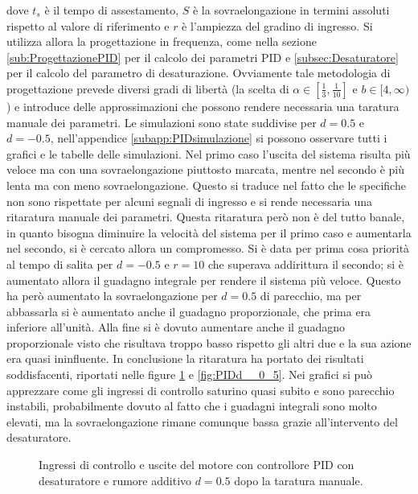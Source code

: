 		\noindent dove $t_s$ è il tempo di assestamento, $S$ è la sovraelongazione in termini assoluti rispetto al valore di
		riferimento e $r$ è l'ampiezza del gradino di ingresso. Si utilizza allora la progettazione in frequenza, come nella sezione \ref{sub:ProgettazionePID} per il calcolo dei parametri PID e \ref{subsec:Desaturatore} per il calcolo del parametro di desaturazione. Ovviamente tale metodologia di progettazione prevede diversi gradi di libertà (la scelta di $\alpha \in [\frac{1}{3},\frac{1}{10}]
		$ e $b \in [4, \infty)$) e introduce delle approssimazioni che possono rendere necessaria una taratura manuale dei parametri. Le simulazioni sono state suddivise per $d=0.5$ e $d=-0.5$, nell'appendice \ref{subapp:PIDsimulazione} si possono osservare tutti i grafici e le tabelle delle simulazioni. Nel primo caso l'uscita del sistema risulta più veloce ma con una sovraelongazione piuttosto marcata, mentre nel secondo è più lenta ma con meno sovraelongazione. Questo si traduce nel fatto che le specifiche non sono rispettate per alcuni segnali di ingresso e si rende necessaria una ritaratura manuale dei parametri. Questa ritaratura però non è del tutto banale, in quanto bisogna diminuire la velocità del sistema per il primo caso e aumentarla nel secondo, si è cercato allora un compromesso. Si è data per prima cosa priorità al tempo di salita per $d=-0.5$ e $r=10$ che superava addirittura il secondo; si è aumentato allora il guadagno integrale per rendere il sistema più veloce. Questo ha però aumentato la sovraelongazione per $d=0.5$ di parecchio, ma per abbassarla si è aumentato anche il guadagno proporzionale, che prima era inferiore all'unità. Alla fine si è dovuto aumentare anche il guadagno proporzionale visto che risultava troppo basso rispetto gli altri due e la sua azione era quasi ininfluente. In conclusione la ritaratura ha portato dei risultati soddisfacenti, riportati nelle figure \ref{fig:PIDd_0_5} e \ref{fig:PIDd__0_5}. Nei grafici si può apprezzare come gli ingressi di controllo saturino quasi subito e sono parecchio instabili, probabilmente dovuto al fatto che i  guadagni integrali sono molto elevati, ma la sovraelongazione rimane comunque bassa grazie all'intervento del desaturatore.
		
		\begin{figure}[H]
			\centering
			 
			\caption{Ingressi di controllo e uscite del motore con controllore PID con desaturatore e rumore additivo $d=0.5$ dopo la taratura manuale.}
			\label{fig:PIDd_0_5}
		\end{figure}
		
